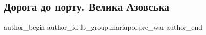  
 
 
 
 

\subsection{Дорога до порту. Велика Азовська}
\label{sec:12_02_2023.fb.fb_group.mariupol.pre_war.10.doroga_do_portu__vel}

\ifcmt
 author_begin
   author_id fb_group.mariupol.pre_war
 author_end
\fi
